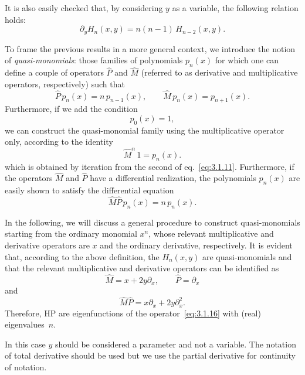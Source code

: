 It is also easily checked that, by considering $y$ as a variable,
the following relation holds:
\begin{equation}
\partial_y H_n(x,y)=n(n-1)\,H_{n-2}(x,y).
\label{eq:3.1.10}
\end{equation}

To frame the previous results in a more general context, we introduce
the notion of \emph{quasi-monomials}: those families of polynomials
$p_n(x)$ for which one can define a couple of operators $\hat P$ and
$\hat M$ (referred to as derivative and multiplicative operators,
respectively) such that
\begin{equation}
\hat P\,p_n(x)=n\,p_{n-1}(x),\qquad
\hat M\,p_n(x)=p_{n+1}(x).
\label{eq:3.1.11}
\end{equation}
Furthermore, if we add the condition
\begin{equation}
p_0(x)=1,
\label{eq:3.1.12}
\end{equation}
we can construct the quasi-monomial family using the multiplicative
operator only, according to the identity
\begin{equation}
\hat M^n\,1=p_n(x).
\label{eq:3.1.13}
\end{equation}
which is obtained by iteration from the second of
eq.~\eqref{eq:3.1.11}. Furthermore, if the operators $\hat M$ and
$\hat P$ have a differential realization, the polynomials $p_n(x)$ are
easily shown to satisfy the differential equation
\begin{equation}
\hat M\hat P\,p_n(x)=n\,p_n(x).
\label{eq:3.1.14}
\end{equation}

In the following, we will discuss a general procedure to construct
quasi-monomials starting from the ordinary monomial $x^n$, whose
relevant multiplicative and derivative operators are $x$ and the
ordinary derivative, respectively. It is evident that, according to
the above definition, the $H_n(x,y)$ are quasi-monomials and that
the relevant multiplicative and derivative operators can be identified as
\begin{equation}
\hat M=x+2y\partial_x,\qquad \hat P=\partial_x
\label{eq:3.1.15}
\end{equation}
and
\begin{equation}
\hat M\hat P=x\partial_x+2y\partial_x^2.
\label{eq:3.1.16}
\end{equation}
Therefore, HP are eigenfunctions of the operator~\eqref{eq:3.1.16}
with (real) eigenvalues~$n$.

 In this case $y$ should be considered a
parameter and not a variable. The notation of total derivative
should be used but we use the partial derivative for continuity of
notation.

